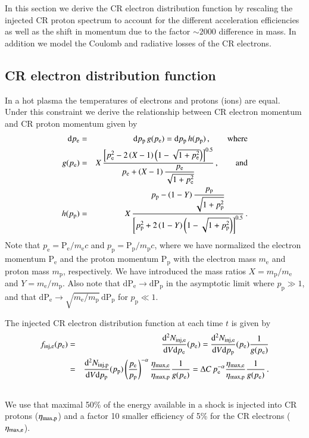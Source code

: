 \documentclass[useAMS,usenatbib]{mn2e}
\newcommand{\dd}{\mathrm{d}}
\newcommand{\p}{\mathrm{p}}
\newcommand{\Pp}{\mathrm{P}_\mathrm{p}}
\newcommand{\Pe}{\mathrm{P}_\mathrm{e}}
\newcommand{\pp}{p_\mathrm{p}}
\newcommand{\pe}{p_\mathrm{e}}
\newcommand{\e}{\mathrm{e}}
\begin{document}
In this section we derive the CR electron distribution function by
rescaling the injected CR proton spectrum to account for the different
acceleration efficiencies as well as the shift in momentum due to the
factor $\sim 2000$ difference in mass. In addition we model the
Coulomb and radiative losses of the CR electrons.

\subsection{CR electron distribution function} 
In a hot plasma the temperatures of electrons and protons (ions) are
equal. Under this constraint we derive the relationship between CR
electron momentum and CR proton momentum given by
\begin{eqnarray}
  \label{eq:pe_pp}
\dd \pe &=& \dd \pp \,g(\pe) =  \dd \pp \,h(\pp)\,,\qquad \rmn{where}\\
g(\pe) &=& X \,\frac{\left[\pe^2-2\left(X-1\right)\left(1-\sqrt{1+\pe^2}\right)\right]^{0.5}}{\displaystyle\pe+\left(X-1\right)\frac{\pe}{\sqrt{1+\pe^2}}}\,,\qquad \rmn{and}\\
h(\pp) &=& X \,\frac{\displaystyle\pp-\left(1-Y\right)\frac{\pp}{\sqrt{1+\pp^2}}}{\left[\pp^2+2\left(1-Y\right)\left(1-\sqrt{1+\pp^2}\right)\right]^{0.5}}\,.\\
\end{eqnarray}
Note that $\pe = \Pe/m_\e c$ and $\pp = \Pp/m_\p c$, where we have
normalized the electron momentum $\Pe$ and the proton momentum $\Pp$
with the electron mass $m_\e$ and proton mass $m_\p$, respectively. We
have introduced the mass ratios $X=m_\p/m_\e$ and $Y=m_\e/m_\p$. Also
note that $\dd \Pe\rightarrow \dd \Pp$ in the asymptotic limit where
$\pp\gg 1$, and that $\dd \Pe\rightarrow \sqrt{m_\e / m_\p}\,\dd \Pp$ for
$\pp\ll 1$. 

The injected CR electron distribution function at each time $t$ is
given by
\begin{eqnarray}
  \label{eq:f_inj_e}
  f_\rmn{inj,e}(p_\e) &=&  \frac{\dd^2 N_\rmn{inj,e}}{\dd V \dd p_\e}(p_\e) = 
\frac{\dd^2 N_\rmn{inj,e}}{\dd V \dd p_\p}(p_\e)\frac{1}{g(p_\e)} \nonumber\\
&=& \frac{\dd^2 N_\rmn{inj,p}}{\dd V \dd p_\p}(p_\p)
\left(\frac{p_\e}{p_\p}\right)^{-\alpha}\frac{\eta_\rmn{max,e}}{\eta_\rmn{max,p}}\frac{1}{g(p_\e)} = 
\Delta C\,p_\e^{-\alpha}\frac{\eta_\rmn{max,e}}{\eta_\rmn{max,p}}\frac{1}{g(p_\e)}\,.
 \nonumber\\
&&
\end{eqnarray}
We use that maximal 50\% of the energy available in a shock is
injected into CR protons ($\eta_{\mathrm{max,p}}$) and a factor 10 smaller
efficiency of 5\% for the CR electrons ($\eta_{\mathrm{max,e}}$).
\end{document}
